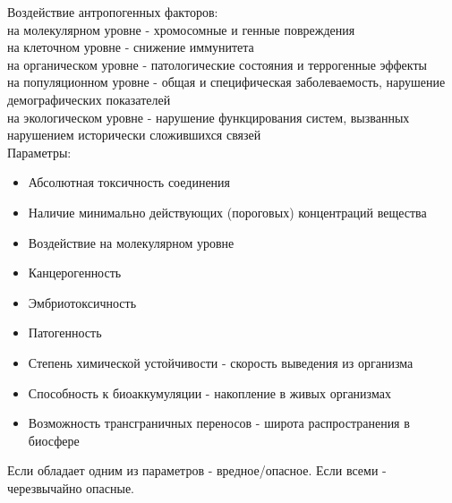 Воздействие антропогенных факторов:\\
на молекулярном уровне - хромосомные и генные повреждения\\
на клеточном уровне - снижение иммунитета\\
на органическом уровне - патологические состояния и террогенные эффекты\\
на популяционном уровне - общая и специфическая заболеваемость, нарушение демографических показателей\\
на экологическом уровне - нарушение функцирования систем, вызванных нарушением исторически сложившихся связей\\

Параметры:
\begin{itemize}
\item Абсолютная токсичность соединения
\item Наличие минимально действующих (пороговых) концентраций вещества
\item Воздействие на молекулярном уровне
\item Канцерогенность
\item Эмбриотоксичность
\item Патогенность
\item Степень химической устойчивости - скорость выведения из организма
\item Способность к биоаккумуляции - накопление в живых организмах
\item Возможность трансграничных переносов - широта распространения в биосфере
\end{itemize}
Если обладает одним из параметров - вредное/опасное. Если всеми - черезвычайно опасные.